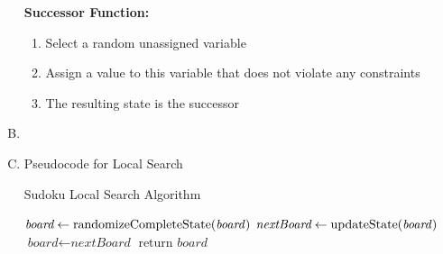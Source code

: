 \documentclass[10pt,a4paper]{article}
\begin{document}
\begin{enumerate}[A.]
		\textbf{Successor Function:}  
		
		\begin{enumerate}[1.]
			\item Select a random unassigned variable 
			\item Assign a value to this variable that does not violate any constraints
			\item The resulting state is the successor
		\end{enumerate}
		
		\textbf{}
		
		\item 

		\item Pseudocode for Local Search

		\begin{algorithm}
			\caption{Sudoku Local Search Algorithm}\label{euclid}
			\begin{algorithmic}[1]
				\State $\textit{board} \gets \text{randomizeCompleteState(\textit{board})}$
				\State $\textit{nextBoard} \gets \text{updateState(\textit{board})}$
				\State $\textit{board} \gets \textit{nextBoard}$
				\EndIf
				\EndWhile
				\State $\text{return }\textit{board}$
				\EndProcedure
			\end{algorithmic}
		\end{algorithm}
		
	\end{enumerate}
	
    
\end{document}
